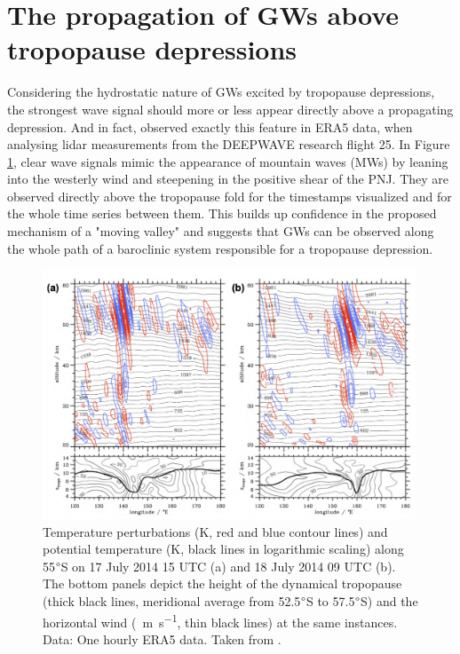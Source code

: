 \section{The propagation of GWs above tropopause depressions}
\label{sec:propagation}
Considering the hydrostatic nature of GWs excited by tropopause depressions, the strongest wave signal should more or less appear directly above a propagating depression. And in fact, \textcite{dornbrack_stratospheric_2022} observed exactly this feature in ERA5 data, when analysing lidar measurements from the DEEPWAVE research flight 25. In Figure \ref{fig:RF25_era5_vertical}, clear wave signals mimic the appearance of mountain waves (MWs) by leaning into the westerly wind and steepening in the positive shear of the PNJ. They are observed directly above the tropopause fold for the timestamps visualized and for the whole time series between them. This builds up confidence in the proposed mechanism of a "moving valley" and suggests that GWs can be observed along the whole path of a baroclinic system responsible for a tropopause depression. \\
%
\begin{figure}[t]
    \centering
    \includegraphics[width=0.99\textwidth]{figures_intro/RF25_ERA5_vertical.png}
    \caption{Temperature perturbations (K, red and blue contour lines) and potential temperature (K, black lines in logarithmic scaling) along 55$\degree$S on 17 July 2014 15 UTC (a) and 18 July 2014 09 UTC (b). The bottom panels depict the height of the dynamical tropopause (thick black lines, meridional average from 52.5$\degree$S to 57.5$\degree$S) and the horizontal wind (\SI{}{\meter\per\second}, thin black lines) at the same instances. Data: One hourly ERA5 data. Taken from \textcite[]{dornbrack_stratospheric_2022}.}
    \label{fig:RF25_era5_vertical}
\end{figure}

